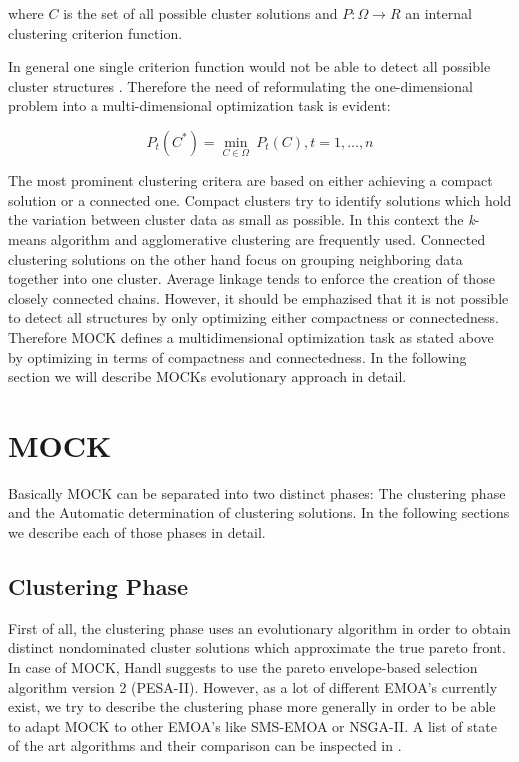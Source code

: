 \documentclass[parskip=half,DIV=14]{scrartcl}\usepackage[]{graphicx}\usepackage[]{color}
\begin{document}
where $C$ is the set of all possible cluster solutions and $P:\Omega \rightarrow R$ an internal clustering criterion function. 

In general one single criterion function would not be able to detect all possible cluster structures \cite{handl2007}. Therefore the need of reformulating the one-dimensional problem into a multi-dimensional optimization task is evident:

\begin{displaymath}
P_t(C^*) = \underset{C\in\Omega}{\min}\ P_t(C), t=1,...,n
\end{displaymath}

The most prominent clustering critera are based on either achieving a compact solution or a connected one. Compact clusters try to identify solutions which hold the variation between cluster data as small as possible. In this context the \textit{k}-means algorithm\cite{kmeans} and agglomerative clustering are frequently used. Connected clustering solutions on the other hand focus on grouping neighboring data together into one cluster. Average linkage tends to enforce the creation of those closely connected chains. However, it should be emphazised that it is not possible to detect all structures by only optimizing either compactness or connectedness. Therefore MOCK defines a multidimensional optimization task as stated above by optimizing in terms of compactness and connectedness. In the following section we will describe MOCKs evolutionary approach in detail.

\section{MOCK}

Basically MOCK can be separated into two distinct phases: The clustering phase and the Automatic determination of clustering solutions. In the following sections we describe each of those phases in detail.

\subsection{Clustering Phase}
First of all, the clustering phase uses an evolutionary algorithm in order to obtain distinct nondominated cluster solutions which approximate the true pareto front. In case of MOCK, Handl suggests to use the pareto envelope-based selection algorithm version 2 (PESA-II). However, as a lot of different EMOA's currently exist, we try to describe the clustering phase more generally in order to be able to adapt MOCK to other EMOA's like SMS-EMOA or NSGA-II. A list of state of the art algorithms and their comparison can be inspected in \cite{comparison}.
\end{document}
